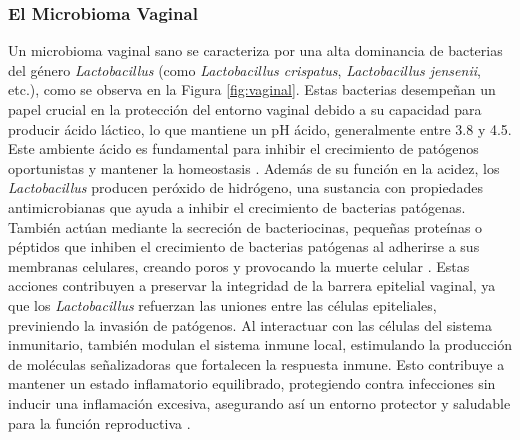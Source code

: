 \subsubsection{El Microbioma Vaginal}

Un microbioma vaginal sano se caracteriza por una alta dominancia de bacterias del género \textit{Lactobacillus} (como \textit{Lactobacillus crispatus}, \textit{Lactobacillus jensenii}, etc.), como se observa en la Figura \ref{fig:vaginal}. Estas bacterias desempeñan un papel crucial en la protección del entorno vaginal debido a su capacidad para producir ácido láctico, lo que mantiene un pH ácido, generalmente entre 3.8 y 4.5. Este ambiente ácido es fundamental para inhibir el crecimiento de patógenos oportunistas y mantener la homeostasis \cite{hickey2012understanding}. Además de su función en la acidez, los \textit{Lactobacillus} producen peróxido de hidrógeno, una sustancia con propiedades antimicrobianas que ayuda a inhibir el crecimiento de bacterias patógenas. También actúan mediante la secreción de bacteriocinas, pequeñas proteínas o péptidos que inhiben el crecimiento de bacterias patógenas al adherirse a sus membranas celulares, creando poros y provocando la muerte celular \cite{ravel2011vaginal}. Estas acciones contribuyen a preservar la integridad de la barrera epitelial vaginal, ya que los \textit{Lactobacillus} refuerzan las uniones entre las células epiteliales, previniendo la invasión de patógenos. Al interactuar con las células del sistema inmunitario, también modulan el sistema inmune local, estimulando la producción de moléculas señalizadoras que fortalecen la respuesta inmune. Esto contribuye a mantener un estado inflamatorio equilibrado, protegiendo contra infecciones sin inducir una inflamación excesiva, asegurando así un entorno protector y saludable para la función reproductiva \cite{chen2021female}.


